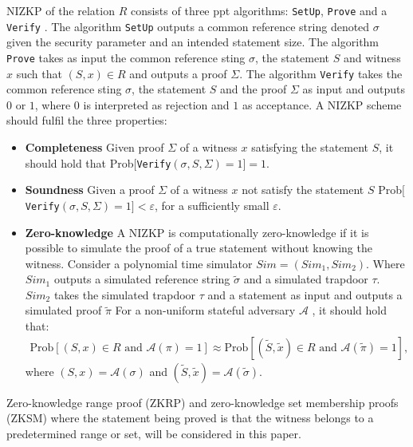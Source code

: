 \begin{Mydef}
\label{def:ZKP}
NIZKP of the relation $R$ consists of three ppt algorithms: \texttt{SetUp}, \texttt{Prove} and a \texttt{Verify} \cite{NIZKP}. The algorithm \texttt{SetUp} outputs a common reference string denoted $\sigma$ given the security parameter and an intended statement size. The algorithm \texttt{Prove} takes as input the common reference sting $\sigma$, the statement $S$ and witness $x$ such that $(S,x)\in R$ and outputs a proof $\Sigma$. The algorithm \texttt{Verify} takes the common reference sting $\sigma$, the statement $S$ and the proof $\Sigma$ as input and outputs $0$ or $1$, where $0$ is interpreted as rejection and $1$ as acceptance. A NIZKP scheme should fulfil the three properties: 
\begin{itemize}

\item \textbf{Completeness} Given proof $\Sigma$ of a witness $x$ satisfying the statement $S$, it should hold that Prob$[$\texttt{Verify}$(\sigma,S, \Sigma) = 1]=1$.

\item \textbf{Soundness}  Given a proof $\Sigma$ of a witness $x$ not satisfy the statement $S$ Prob$[$\texttt{Verify}$(\sigma,S,\Sigma) = 1] < \varepsilon$, for a sufficiently small $\varepsilon$. 

\item  \textbf{Zero-knowledge}  A NIZKP is computationally zero-knowledge if it is possible to simulate the proof of a true statement without knowing the witness.  Consider a polynomial time simulator $Sim= (Sim_1,Sim_2)$. Where $Sim_1$ outputs a simulated reference string $\tilde{\sigma}$ and a simulated trapdoor $\tau$. $Sim_2$ takes the simulated trapdoor $\tau$ and a statement as input and outputs a  simulated proof $\tilde{\pi}$  For a non-uniform stateful adversary $\mathcal{A}$ , it should hold  that: 
\begin{align*}
\text{Prob}[(S,x)\in R \text{ and } \mathcal{A}(\pi)=1] \approx \text{Prob}[(\tilde{S},\tilde{x})\in R \text{ and } \mathcal{A}(\tilde{\pi})=1], 
\end{align*}
where $(S,x) = \mathcal{A}(\sigma)$ and $(\tilde{S},\tilde{x}) = \mathcal{A}(\tilde{\sigma})$. 
\end{itemize}

\end{Mydef}
 
Zero-knowledge range proof (ZKRP) and zero-knowledge set membership proofs (ZKSM) where the statement being proved is that the witness belongs to a predetermined range or set, will be considered in this paper.


